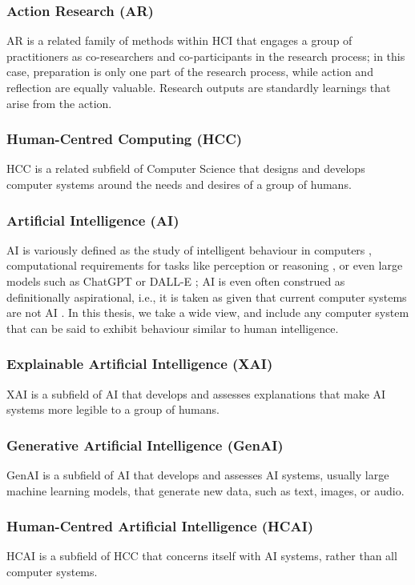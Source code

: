 \subsubsection{Action Research (AR)}
AR is a related family of methods within HCI that engages a group of practitioners as co-researchers and co-participants in the research process; in this case, preparation is only one part of the research process, while action and reflection are equally valuable. Research outputs are standardly learnings that arise from the action.

\subsubsection{Human-Centred Computing (HCC)}
HCC is a related subfield of Computer Science that designs and develops computer systems around the needs and desires of a group of humans.

\subsubsection{Artificial Intelligence (AI)}
AI is variously defined as the study of intelligent behaviour in computers \cite{wang2008you}, computational requirements for tasks like perception or reasoning \cite{Leake2001ArtiicialI}, or even large models such as ChatGPT or DALL-E \cite{du2020ai}; AI is even often construed as definitionally aspirational, i.e., it is taken as given that current computer systems are not AI \cite{wang2008you}. In this thesis, we take a wide view, and include any computer system that can be said to exhibit behaviour similar to human intelligence.

\subsubsection{Explainable Artificial Intelligence (XAI)}
XAI is a subfield of AI that develops and assesses explanations that make AI systems more legible to a group of humans.

\subsubsection{Generative Artificial Intelligence (GenAI)}
GenAI is a subfield of AI that develops and assesses AI systems, usually large machine learning models, that generate new data, such as text, images, or audio.

\subsubsection{Human-Centred Artificial Intelligence (HCAI)}
HCAI is a subfield of HCC that concerns itself with AI systems, rather than all computer systems.

